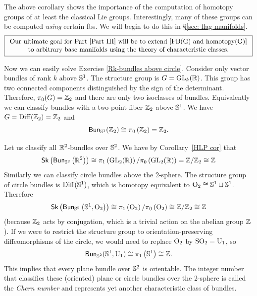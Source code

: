 The above corollary shows the importance of the computation of homotopy groups of at least the classical Lie groups. Interestingly, many of these groups can be computed \emph{using} certain \glspl{fb}. We will begin to do this in \S\ref{sec: flag manifolds}.
\[\boxed{\begin{array}{c}
    \text{Our ultimate goal for Part \ref{Part III} will be to extend \eqref{FB(G) and homotopy(G)}}\\
    \text{to arbitrary base manifolds using the theory of characteristic classes.}
\end{array}}
\] 


\begin{example}
    Now we can easily solve Exercise \ref{Rk-bundles above circle}. Consider only vector bundles of rank $k$ above $\mathbb{S}^1$. The structure group is $G=\operatorname{GL}_k(\mathbb{R})$. This group has two connected components distinguished by the sign of the determinant. Therefore, $\pi_0(G)=\mathbb{Z}_2$ and there are only two isoclasses of bundles. Equivalently we can classify bundles with a two-point fiber $\mathbb{Z}_2$ above $\mathbb{S}^1$. We have $G=\operatorname{Diff}(\mathbb{Z}_2)=\mathbb{Z}_2$ and
    \[
        \mathsf{Bun}_{\mathbb{S}^1}(\mathbb{Z}_2)\cong \pi_{0}\left(\mathbb{Z}_2\right)=\mathbb{Z}_2.
    \]
    \end{example}
    \begin{example}
    Let us classify all $\mathbb{R}^2$-bundles over $\mathbb{S}^2$. We have by Corollary~\ref{HLP cor} that 
    \[
        \mathsf{Sk}\left(\mathsf{Bun}_{\mathbb{S}^2}\left(\mathbb{R}^2\right)\right)\cong \pi_{1}\left(\operatorname{GL}_2(\mathbb{R} )\right)/\pi_0\left(\operatorname{GL}_2(\mathbb{R} )\right)=\mathbb{Z}/\mathbb{Z}_2\cong \mathbb{Z}
    \]
    Similarly we can classify circle bundles above the 2-sphere. The structure group of circle bundles is $\operatorname{Diff}(\mathbb{S}^1)$, which is homotopy equivalent to $\operatorname{O}_2\cong \mathbb{S}^1\sqcup \mathbb{S}^1$. Therefore
    \[
        \mathsf{Sk}\left(\mathsf{Bun}_{\mathbb{S}^2}\left(\mathbb{S}^1,\operatorname{O}_2\right)\right)\cong \pi_{1}\left(\operatorname{O}_2\right)/\pi_0\left(\operatorname{O}_2\right)\cong\mathbb{Z}/\mathbb{Z}_2\cong\mathbb{Z}
    \]
    (because $\mathbb{Z}_2$ acts by conjugation, which is a trivial action on the abelian group $\mathbb{Z}$). If we were to restrict the structure group to orientation-preserving diffeomorphisms of the circle, we would need to replace $\operatorname{O}_2$ by $\operatorname{SO}_2=\operatorname{U}_1$, so 
    \[
        \mathsf{Bun}_{\mathbb{S}^2}(\mathbb{S}^1,\operatorname{U}_1)\cong \pi_{1}\left(\mathbb{S}^1\right)\cong\mathbb{Z}.
    \]
    This implies that every plane bundle over $\mathbb{S}^2$ is orientable. The integer number that classifies these (oriented) plane or circle bundles over the 2-sphere is called the \emph{Chern number} and represents yet another characteristic class of bundles.
\end{example}


